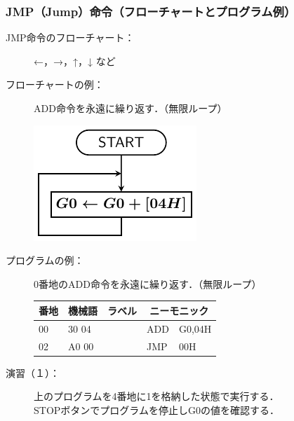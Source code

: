 \documentclass[handout]{beamer}        %
\begin{document}
\begin{frame}
  \frametitle{JMP（Jump）命令（フローチャートとプログラム例）}
  \begin{description}
  \item[JMP命令のフローチャート：]  ←，→，↑，↓ など
    \vfill

  \item[フローチャートの例：]ADD命令を永遠に繰り返す．（無限ループ）\\
    \centerline{\includegraphics[scale=0.8]{../Tikz/flow0.pdf}}
    \vfill

  \item[プログラムの例：]0番地のADD命令を永遠に繰り返す．（無限ループ）\\
    {\ttfamily\small\begin{center}
      \begin{tabular}{|l|l|l|l l|} \hline
        番地 & 機械語 & ラベル & \multicolumn{2}{|c|}{ニーモニック} \\
        \hline
        00 & 30 04 & & ADD  & G0,04H \\
        02 & A0 00 & & JMP  & 00H \\
        \hline
      \end{tabular}
    \end{center}}
    \vfill

  \item[演習（１）：]上のプログラムを4番地に1を格納した状態で実行する．\\
    STOPボタンでプログラムを停止しG0の値を確認する．
    \vfill
  \end{description}
\end{frame}
\end{document}
